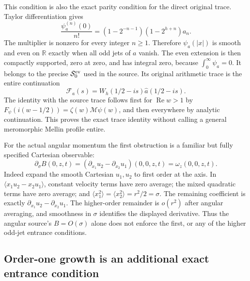 This condition is also the exact parity condition for the direct
original trace. Taylor differentiation gives
\[
 \frac{\psi_a^{(n)}(0)}{n!}
  =(1-2^{-n-1})(1-2^{h+n})a_n .
\]
The multiplier is nonzero for every integer $n\geq1$.
Therefore $\psi_a(|x|)$ is smooth and even on $\mathbb R$
exactly when all odd jets of $a$ vanish. The even extension is then
compactly supported, zero at zero, and has integral zero, because
$\int_0^\infty\psi_a=0$. It belongs to the precise
$\mathcal S_0^{\rm ev}$ used in the source. Its original arithmetic
trace is the entire continuation
\[
 \mathcal F_a(s)=W_h(1/2-is)\widehat a(1/2-is).
\]
The identity with the source trace follows first for
$\operatorname{Re}w>1$ by
$F_\psi(i(w-1/2))=\zeta(w)\mathcal M\psi(w)$, and then everywhere
by analytic continuation. This proves the exact trace identity
without calling a general meromorphic Mellin profile entire.

For the actual angular momentum the first obstruction is a familiar
but fully specified Cartesian observable:
\begin{equation}
 \partial_\sigma B(0,z,t)
 =(\partial_{x_1}u_2-\partial_{x_2}u_1)(0,0,z,t)
 =\omega_z(0,0,z,t).
 \label{eq:cq-angular-axis-vorticity}
\end{equation}
Indeed expand the smooth Cartesian $u_1,u_2$ to first order at
the axis. In
$\langle x_1u_2-x_2u_1\rangle$, constant velocity terms have zero
average; the mixed quadratic terms have zero average; and
$\langle x_1^2\rangle=\langle x_2^2\rangle=r^2/2=\sigma$.
The remaining coefficient is exactly
$\partial_{x_1}u_2-\partial_{x_2}u_1$.
The higher-order remainder is $o(r^2)$ after angular averaging,
and smoothness in $\sigma$ identifies the displayed derivative.
Thus the angular source's $B=O(\sigma)$ alone does not enforce the
first, or any of the higher odd-jet entrance conditions.

\subsection{Order-one growth is an additional exact entrance condition}

